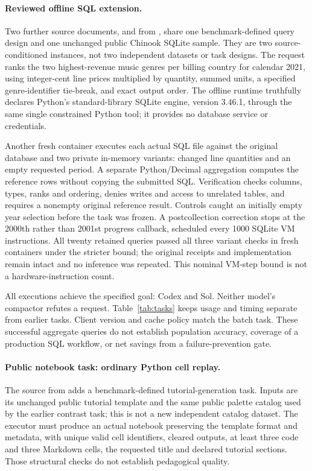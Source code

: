 \paragraph{Reviewed offline SQL extension.}
Two further source documents,  and  from
, share one benchmark-defined query
design and one unchanged public Chinook SQLite sample. They are two
source-conditioned instances, not two independent datasets or task designs.
The request ranks the two highest-revenue music genres per billing country
for calendar 2021, using integer-cent line prices multiplied by quantity,
summed units, a specified genre-identifier tie-break, and exact output order.
The offline runtime truthfully declares Python's standard-library SQLite
engine, version 3.46.1, through the same single constrained Python tool;
it provides no database service or credentials.

Another fresh container executes each actual SQL file against the original
database and two private in-memory variants: changed line quantities and an
empty requested period. A separate Python/Decimal aggregation computes the
reference rows without copying the submitted SQL. Verification checks
columns, types, ranks and ordering, denies writes and access to unrelated
tables, and requires a nonempty original reference result. Controls caught
an initially empty year selection before the task was frozen. A
postcollection correction stops at the 2000th rather than 2001st progress
callback, scheduled every 1000 SQLite VM instructions. All twenty retained
queries passed all three variant checks in fresh containers under the stricter bound;
the original receipts and implementation remain intact and no inference
was repeated. This nominal VM-step bound is not a hardware-instruction count.

All \SqliteExecutions{} executions achieve the specified goal:
\SqliteCodexAchieved{} Codex and \SqliteSolAchieved{} Sol. Neither model's
compactor refutes a request. Table~\ref{tab:tasks} keeps usage and
timing separate from earlier tasks. Client version and cache policy match
the batch task. These successful aggregate queries do not establish
population accuracy, coverage of a production SQL workflow, or net savings
from a failure-prevention gate.

\paragraph{Public notebook task: ordinary Python cell replay.}
The  source from  adds a
benchmark-defined tutorial-generation task. Inputs are its unchanged public
tutorial template and the same public palette catalog used by the earlier
contrast task; this is not a new independent catalog dataset. The executor
must produce an actual notebook preserving the template format and metadata,
with unique valid cell identifiers, cleared outputs, at least three code
and three Markdown cells, the requested title and declared tutorial sections.
Those structural checks do not establish pedagogical quality.

